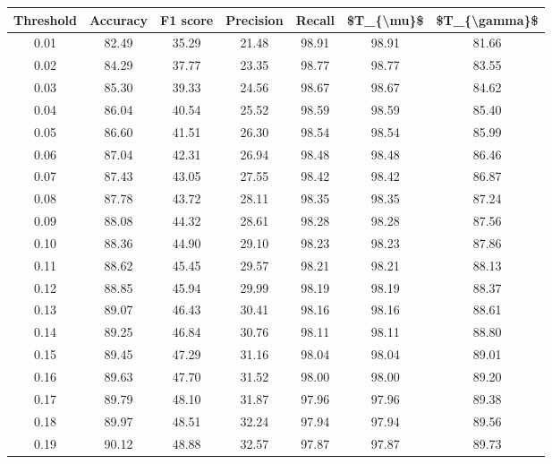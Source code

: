 \begin{tabular}{|c|c|c|c|c|c|c|}
\hline
 Threshold &  Accuracy &  F1 score &  Precision &  Recall &  \$T\_\{\textbackslash mu\}\$ &  \$T\_\{\textbackslash gamma\}\$ \\
\hline
      0.01 &     82.49 &     35.29 &      21.48 &   98.91 &      98.91 &         81.66 \\
      0.02 &     84.29 &     37.77 &      23.35 &   98.77 &      98.77 &         83.55 \\
      0.03 &     85.30 &     39.33 &      24.56 &   98.67 &      98.67 &         84.62 \\
      0.04 &     86.04 &     40.54 &      25.52 &   98.59 &      98.59 &         85.40 \\
      0.05 &     86.60 &     41.51 &      26.30 &   98.54 &      98.54 &         85.99 \\
      0.06 &     87.04 &     42.31 &      26.94 &   98.48 &      98.48 &         86.46 \\
      0.07 &     87.43 &     43.05 &      27.55 &   98.42 &      98.42 &         86.87 \\
      0.08 &     87.78 &     43.72 &      28.11 &   98.35 &      98.35 &         87.24 \\
      0.09 &     88.08 &     44.32 &      28.61 &   98.28 &      98.28 &         87.56 \\
      0.10 &     88.36 &     44.90 &      29.10 &   98.23 &      98.23 &         87.86 \\
      0.11 &     88.62 &     45.45 &      29.57 &   98.21 &      98.21 &         88.13 \\
      0.12 &     88.85 &     45.94 &      29.99 &   98.19 &      98.19 &         88.37 \\
      0.13 &     89.07 &     46.43 &      30.41 &   98.16 &      98.16 &         88.61 \\
      0.14 &     89.25 &     46.84 &      30.76 &   98.11 &      98.11 &         88.80 \\
      0.15 &     89.45 &     47.29 &      31.16 &   98.04 &      98.04 &         89.01 \\
      0.16 &     89.63 &     47.70 &      31.52 &   98.00 &      98.00 &         89.20 \\
      0.17 &     89.79 &     48.10 &      31.87 &   97.96 &      97.96 &         89.38 \\
      0.18 &     89.97 &     48.51 &      32.24 &   97.94 &      97.94 &         89.56 \\
      0.19 &     90.12 &     48.88 &      32.57 &   97.87 &      97.87 &         89.73 \\

\end{tabular}
